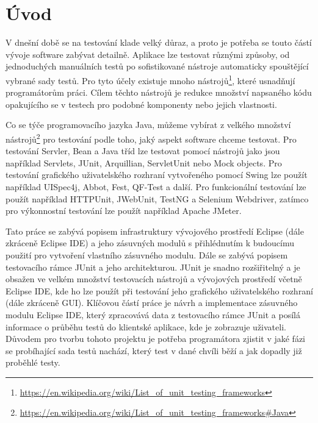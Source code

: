 
\chapter{Úvod}                                                            %
V dnešní době se na testování klade velký důraz, a proto je potřeba se touto částí vývoje software zabývat detailně. Aplikace lze testovat různými způsoby, od jednoduchých manuálních testů po sofistikované nástroje automaticky spouštějící vybrané sady testů. Pro tyto účely existuje mnoho nástrojů\footnote{\url{https://en.wikipedia.org/wiki/List_of_unit_testing_frameworks}}, které usnadňují programátorům práci. Cílem těchto nástrojů je redukce množství napsaného kódu opakujícího se v testech pro podobné komponenty nebo jejich vlastnosti.

Co se týče programovacího jazyka Java, můžeme vybírat z velkého množství nástrojů\footnote{\url{https://en.wikipedia.org/wiki/List_of_unit_testing_frameworks\#Java}} pro testování podle toho, jaký aspekt software chceme testovat. Pro testování Servler, Bean a Java tříd lze testovat pomocí nástrojů jako jsou například Servlets, JUnit, Arquillian, ServletUnit nebo Mock objects. Pro testování grafického uživatelského rozhraní vytvořeného pomocí Swing lze použít například UISpec4j, Abbot, Fest, QF-Test a další. Pro funkcionální testování lze použít například HTTPUnit, JWebUnit, TestNG a Selenium Webdriver, zatímco pro výkonnostní testování lze použít například Apache JMeter.

Tato práce se zabývá popisem infrastruktury vývojového prostředí Eclipse (dále zkráceně Eclipse IDE) a jeho zásuvných modulů s přihlédnutím k budoucímu použití pro vytvoření vlastního zásuvného modulu. Dále se zabývá popisem testovacího rámce JUnit a jeho architekturou. JUnit je snadno rozšiřitelný a je obsažen ve velkém množství testovacích nástrojů a vývojových prostředí včetně Eclipse IDE, kde ho lze použít při testování jeho grafického uživatelského rozhraní (dále zkráceně GUI). Klíčovou částí práce je návrh a implementace zásuvného modulu Eclipse IDE, který zpracovává data z testovacího rámce JUnit a posílá informace o průběhu testů do klientské aplikace, kde je zobrazuje uživateli. Důvodem pro tvorbu tohoto projektu je potřeba programátora zjistit v jaké fázi se probíhající sada testů nachází, který test v dané chvíli běží a jak dopadly již proběhlé testy.



